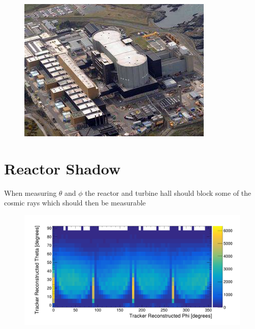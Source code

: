 \begin{figure}[H]
 \centering
 \includegraphics[width=0.7\linewidth]{Chapter5/Figs/Raster/wylfaArielView.png}
 \label{fig:wylfaAir}
\end{figure}


\section{Reactor Shadow} \label{sec:ReactorShadow}
When measuring $\theta$ and $\phi$ the reactor and turbine hall should block some of the cosmic rays which should then be measurable 

\begin{figure}[H]
 \centering
 \includegraphics[width=0.8\linewidth]{Chapter5/Figs/Raster/simpleTrackTheta3000-9999IncBelow10.png}
 \label{fig:reactorShadowSimpleTracker}
\end{figure}

